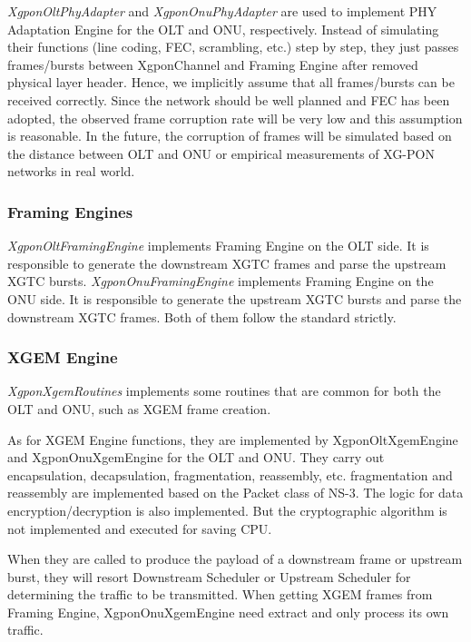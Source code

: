 \emph{XgponOltPhyAdapter} and \emph{XgponOnuPhyAdapter} are used
to implement PHY Adaptation Engine for the OLT and ONU,
respectively. Instead of simulating their functions (line coding,
FEC, scrambling, etc.) step by step, they just passes
frames/bursts between XgponChannel and Framing Engine after
removed physical layer header. Hence, we implicitly assume that
all frames/bursts can be received correctly. Since the network
should be well planned and FEC has been adopted, the observed
frame corruption rate will be very low and this assumption is
reasonable. In the future, the corruption of frames will be
simulated based on the distance between OLT and ONU or 
empirical measurements of XG-PON networks in real world. 




\subsubsection{Framing Engines}

\emph{XgponOltFramingEngine} implements Framing Engine on the OLT
side. It is responsible to generate the downstream XGTC frames and
parse the upstream XGTC bursts. \emph{XgponOnuFramingEngine}
implements Framing Engine on the ONU side. It is responsible to
generate the upstream XGTC bursts and parse the downstream XGTC
frames. Both of them follow the standard strictly.


\subsubsection{XGEM Engine}
\emph{XgponXgemRoutines} implements some routines that are common
for both the OLT and ONU, such as XGEM frame creation.

As for XGEM Engine functions, they are implemented by
XgponOltXgemEngine and XgponOnuXgemEngine for the OLT and ONU.
They carry out encapsulation, decapsulation, fragmentation,
reassembly, etc. fragmentation and reassembly are implemented
based on the Packet class of NS-3. The logic for data
encryption/decryption is also implemented. But the cryptographic
algorithm is not implemented and executed for saving CPU.

When they are called to produce the payload of a downstream frame
or upstream burst, they will resort Downstream Scheduler or
Upstream Scheduler for determining the traffic to be transmitted.
When getting XGEM frames from Framing Engine, XgponOnuXgemEngine
need extract and only process its own traffic.

